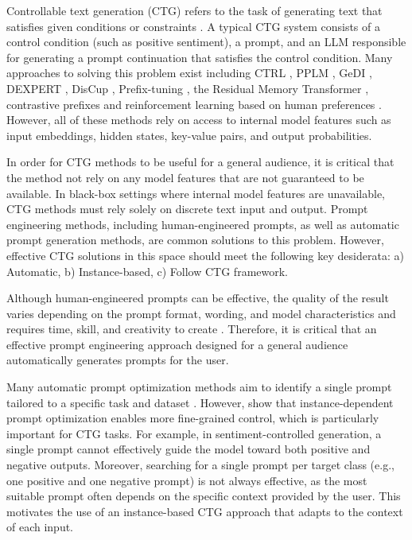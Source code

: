 \documentclass[phd,electronic,oneside,twosidetoc,letterpaper,chaptercenter,parttop,lof]{byumsphd}
\begin{document}
Controllable text generation (CTG) refers to the task of generating text that satisfies given conditions or constraints \cite{zhang2023survey}. 
A typical CTG system consists of a control condition (such as positive sentiment), a prompt, and an LLM responsible for generating a prompt continuation that satisfies the control condition.
Many approaches to solving this problem exist including CTRL \cite{keskar2019ctrl}, PPLM \cite{dathathri2020plug}, GeDI \cite{krause2021gedi}, DEXPERT \cite{liu2021dexpert}, DisCup \cite{zhang2022discup}, Prefix-tuning \cite{li2021prefix}, the Residual Memory Transformer \cite{zhang2023rmt}, contrastive prefixes \cite{qian-etal-2022-controllable} and reinforcement learning based on human preferences \cite{ziegler2019preferences}.  However, all of these methods rely on access to internal model features such as input embeddings, hidden states, key-value pairs, and output probabilities.

In order for CTG methods to be useful for a general audience, it is critical that the method not rely on any model features that are not guaranteed to be available.  In black-box settings where internal model features are unavailable, CTG methods must rely solely on discrete text input and output.
Prompt engineering methods, including human-engineered prompts, as well as automatic prompt generation methods, are common solutions to this problem.
However, effective CTG solutions in this space should meet the following key desiderata: a) Automatic, b) Instance-based, c) Follow CTG framework.

Although human-engineered prompts can be effective, the quality of the result varies depending on the prompt format, wording, and model characteristics \cite{meincke2025prompting} and requires time, skill, and creativity to create \cite{lazovsky2025prompt}.
Therefore, it is critical that an effective prompt engineering approach designed for a general audience automatically generates prompts for the user.

Many automatic prompt optimization methods aim to identify a single prompt tailored to a specific task and dataset \cite{shin2020autoprompt, yang2024opro}.
However, \cite{wu2022idpg} show that instance-dependent prompt optimization enables more fine-grained control, which is particularly important for CTG tasks.
For example, in sentiment-controlled generation, a single prompt cannot effectively guide the model toward both positive and negative outputs.
Moreover, searching for a single prompt per target class (e.g., one positive and one negative prompt) is not always effective, as the most suitable prompt often depends on the specific context provided by the user.
This motivates the use of an instance-based CTG approach that adapts to the context of each input.
\end{document}
